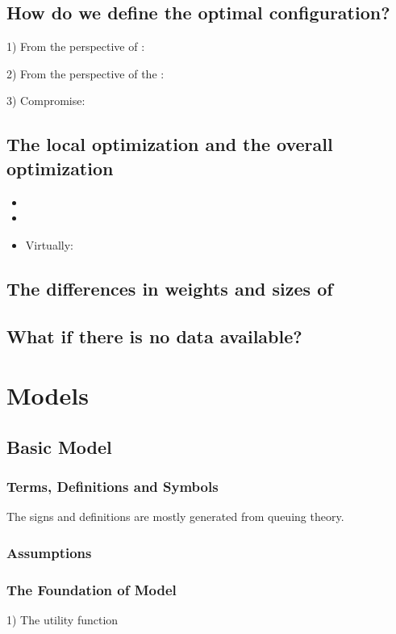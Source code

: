 \documentclass{tzmcmthesis}
\begin{document}
\subsection{How do we define the optimal configuration?}
1) From the perspective of      :\par
2) From the perspective of the      :\par
3) Compromise:

\subsection{The local optimization and the overall optimization}


\begin{itemize}
  \item
  \item
  \item Virtually:
\end{itemize}


\subsection{The differences in weights and sizes of}


\subsection{What if there is no data available?}






\section{Models}
\subsection{Basic Model}


\subsubsection{Terms, Definitions and Symbols}
The signs and definitions are mostly generated from queuing theory.


\subsubsection{Assumptions}


\subsubsection{The Foundation of Model}
1) The utility function
\end{document}

